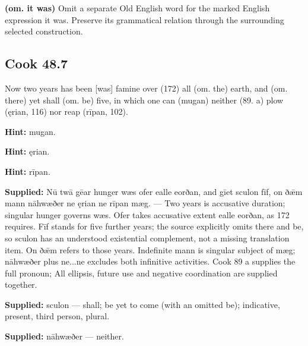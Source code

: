 \textbf{(om. it was)} Omit a separate Old English word for the marked English expression it was. Preserve its grammatical relation through the surrounding selected construction.

\par\begin{minipage}{\linewidth}\raggedright
\subsection*{Cook 48.7}

Now two years has been [was] famine over (172) all (om. the) earth, and (om. there) yet shall (om. be) five, in which one can (mugan) neither (89. a) plow (ęrian, 116) nor reap (rīpan, 102).

\textbf{Hint:} mugan.

\textbf{Hint:} ęrian.

\textbf{Hint:} rīpan.

\end{minipage}\par\addvspace{4pt}

\textbf{Supplied:} Nū twā gēar hunger wæs ofer ealle eorðan, and gīet sculon fīf, on ðǣm mann nāhwæðer ne ęrian ne rīpan mæg. — Two years is accusative duration; singular hunger governs wæs. Ofer takes accusative extent ealle eorðan, as 172 requires. Fīf stands for five further years; the source explicitly omits there and be, so sculon has an understood existential complement, not a missing translation item. On ðǣm refers to those years. Indefinite mann is singular subject of mæg; nāhwæðer plus ne...ne excludes both infinitive activities. Cook 89 a supplies the full pronoun; All ellipsis, future use and negative coordination are supplied together.

\textbf{Supplied:} sculon — shall; be yet to come (with an omitted be); indicative, present, third person, plural.

\textbf{Supplied:} nāhwæðer — neither.

